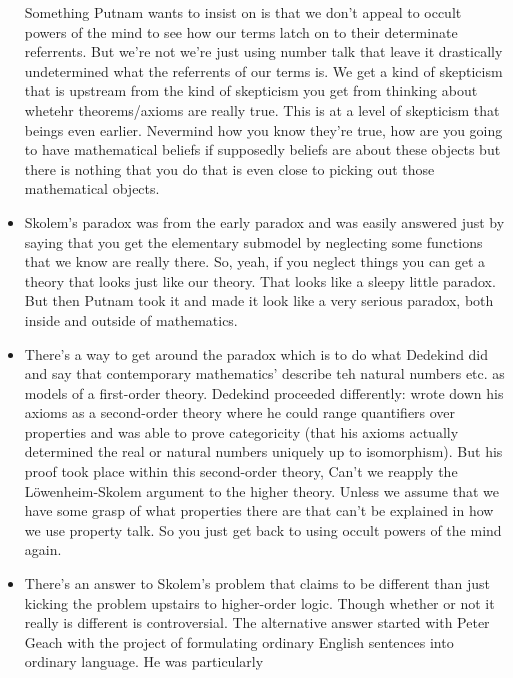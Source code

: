 \documentclass[12pt]{article}
\theoremstyle{definition}
\begin{document}
\begin{itemize}
        Something Putnam wants to insist on is that we don't appeal to occult
        powers of the mind to see how our terms latch on to their determinate
        referrents. But we're not we're just using number talk that leave it
        drastically undetermined what the referrents of our terms is. We get a
        kind of skepticism that is upstream from the kind of skepticism you get
        from thinking about whetehr theorems/axioms are really true.  This is
        at a level of skepticism that beings even earlier. Nevermind how you
        know they're true, how are you going to have mathematical beliefs if
        supposedly beliefs are about these objects but there is nothing that
        you do that is even close to picking out those mathematical objects.
    \item
        Skolem's paradox was from the early paradox and was easily answered
        just by saying that you get the elementary submodel by neglecting some
        functions that we know are really there. So, yeah, if you neglect
        things you can get a theory that looks just like our theory. That looks
        like a sleepy little paradox. But then Putnam took it and made it look
        like a very serious paradox, both inside and outside of mathematics.
    \item
        There's a way to get around the paradox which is to do what Dedekind
        did and say that contemporary mathematics' describe teh natural numbers
        etc. as models of a first-order theory. Dedekind proceeded differently:
        wrote down his axioms as a second-order theory where he could range
        quantifiers over properties and was able to prove categoricity (that
        his axioms actually determined the real or natural numbers uniquely up
        to isomorphism). But his proof took place within this second-order
        theory, Can't we reapply the L\"owenheim-Skolem argument to the higher
        theory. Unless we assume that we have some grasp of what properties
        there are that can't be explained in how we use property talk. So you
        just get back to using occult powers of the mind again. 
    \item
        There's an answer to Skolem's problem that claims to be different than
        just kicking the problem upstairs to higher-order logic. Though whether
        or not it really is different is controversial. The alternative answer
        started with Peter Geach with the project of formulating ordinary
        English sentences into ordinary language. He was particularly

\end{itemize}
\end{document}
